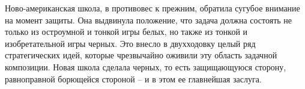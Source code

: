 Ново-американская школа, в противовес к прежним, обратила сугубое внимание на момент защиты. Она выдвинула положение, что задача должна состоять не только из остроумной и тонкой игры белых, но также из тонкой и изобретательной игры черных. Это внесло в двухходовку целый ряд стратегических идей, которые чрезвычайно оживили эту область задачной композиции. Новая школа сделала черных, то есть защищающуюся сторону, равноправной борющейся стороной -- и в этом ее главнейшая заслуга.
